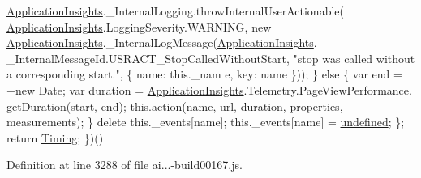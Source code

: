 \begin{DoxyCode}
                    \hyperlink{obj_2_release_2_package_2_package_tmp_2_scripts_2ai_80_822_89-build00167_8js_aa415ef4f8cdd699689ef4b61db7656d8}{ApplicationInsights}.\_InternalLogging.throwInternalUserActionable(
      \hyperlink{obj_2_release_2_package_2_package_tmp_2_scripts_2ai_80_822_89-build00167_8js_aa415ef4f8cdd699689ef4b61db7656d8}{ApplicationInsights}.LoggingSeverity.WARNING, \textcolor{keyword}{new} 
      \hyperlink{obj_2_release_2_package_2_package_tmp_2_scripts_2ai_80_822_89-build00167_8js_aa415ef4f8cdd699689ef4b61db7656d8}{ApplicationInsights}.\_InternalLogMessage(\hyperlink{obj_2_release_2_package_2_package_tmp_2_scripts_2ai_80_822_89-build00167_8js_aa415ef4f8cdd699689ef4b61db7656d8}{ApplicationInsights}.
      \_InternalMessageId.USRACT\_StopCalledWithoutStart, \textcolor{stringliteral}{"stop was called without a corresponding start."}, \{ name: this.\_nam
      e, key: name \}));
                \}
                \textcolor{keywordflow}{else} \{
                    var end = +\textcolor{keyword}{new} Date;
                    var duration = \hyperlink{obj_2_release_2_package_2_package_tmp_2_scripts_2ai_80_822_89-build00167_8js_aa415ef4f8cdd699689ef4b61db7656d8}{ApplicationInsights}.Telemetry.PageViewPerformance.
      getDuration(start, end);
                    this.action(name, url, duration, properties, measurements);
                \}
                \textcolor{keyword}{delete} this.\_events[name];
                this.\_events[name] = \hyperlink{obj_2_release_2_package_2_package_tmp_2_scripts_2jquery-1_810_82_8js_a08113a236cc18d2a9d5ce27e638012be}{undefined};
            \};
            \textcolor{keywordflow}{return} \hyperlink{obj_2_release_2_package_2_package_tmp_2_scripts_2ai_80_822_89-build00167_8js_afdd3ea2c773e0e94771da9013e155095}{Timing};
        \})()
\end{DoxyCode}


Definition at line 3288 of file ai...-\/build00167.\+js.

